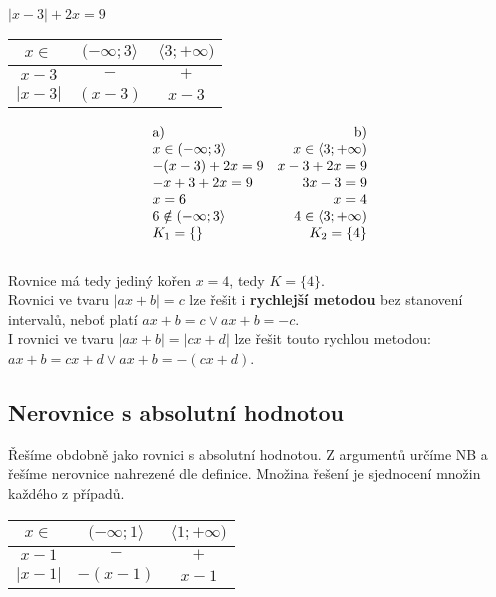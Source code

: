 \documentclass[12pt, a4paper]{article}
\begin{document}
\begin{center}
$|x-3| + 2x = 9$\\
\begin{tabular}{| c | c | c |}
\hline
$x \in $ & $(-\infty; 3 \rangle$ & $\langle 3; +\infty)$\\
\hline
$x-3$ & $-$ & $+$\\
\hline
$|x-3|$ & $(x-3)$ & $x-3$\\
\hline
\end{tabular}
\end{center}

\[
    \begin{array}{ll}
        \text{a)} & \hfill \text{b)}\\
         x \in (-\infty; 3 \rangle & \hfill x \in \langle 3; +\infty)\\
        -(x-3) + 2x = 9 & \hfill x - 3 + 2x = 9\\
        -x+ 3 + 2x = 9 & \hfill 3x - 3 = 9\\
        x = 6 & \hfill x = 4\\
        6 \notin (-\infty; 3 \rangle & \hfill 4 \in \langle 3; +\infty)\\
        K_1 = \{\} & \hfill K_2 = \{4\}\\
    \end{array}
\]\\
Rovnice má tedy jediný kořen $x=4$, tedy $K=\{4\}$.\\

Rovnici ve tvaru $|ax+b|=c$  lze řešit i \textbf{rychlejší metodou} bez stanovení intervalů, neboť platí $ax+b=c \lor ax+b=-c$.\\
I rovnici ve tvaru $|ax+b|=|cx+d|$ lze řešit touto rychlou metodou: $ax+b = cx+d \lor ax+b=-(cx+d)$.\\

\subsection*{Nerovnice s absolutní hodnotou}
Řešíme obdobně jako rovnici s absolutní hodnotou. Z argumentů určíme NB a řešíme nerovnice nahrezené dle definice. Množina řešení je sjednocení množin každého z případů.\\

\begin{center}
\begin{tabular}{| c | c | c |}
\hline
$ x \in $ & $ (-\infty; 1 \rangle $ & $ \langle 1; + \infty) $\\
\hline
$x-1$ & $-$ & $+$\\
\hline
$|x-1|$ & $-(x-1)$ & $x-1$\\
\hline
\end{tabular}
\end{center}
\end{document}
